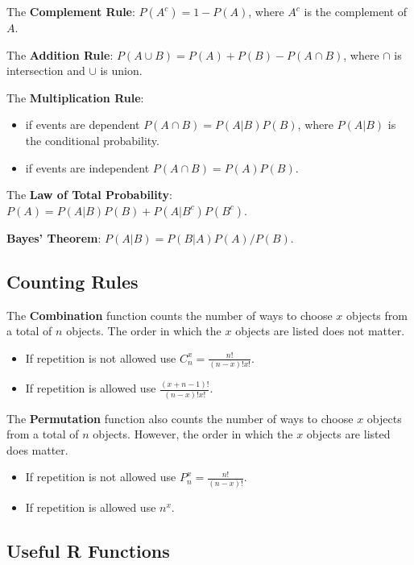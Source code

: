\documentclass[
  letterpaper,
  DIV=11,
  numbers=noendperiod]{scrreprt}
\begin{document}
The \textbf{Complement Rule}: \(P(A^c)=1-P(A)\), where \(A^c\) is the
complement of \(A\).

The \textbf{Addition Rule}: \(P(A \cup B)=P(A)+P(B)-P(A \cap B)\), where
\(\cap\) is intersection and \(\cup\) is union.

The \textbf{Multiplication Rule}:

\begin{itemize}
\item
  if events are dependent \(P(A \cap B)= P(A|B)P(B)\), where \(P(A|B)\)
  is the conditional probability.
\item
  if events are independent \(P(A \cap B)= P(A)P(B)\).
\end{itemize}

The \textbf{Law of Total Probability}:
\(P(A)=P(A|B)P(B)+P(A|B^c)P(B^c)\).

\textbf{Bayes' Theorem}: \(P(A|B)=P(B|A)P(A)/P(B)\).

\hypertarget{counting-rules}{%
\subsection*{Counting Rules}\label{counting-rules}}

The \textbf{Combination} function counts the number of ways to choose
\(x\) objects from a total of \(n\) objects. The order in which the
\(x\) objects are listed does not matter.

\begin{itemize}
\item
  If repetition is not allowed use \(C_n^x= \frac{n!}{(n-x)!x!}\).
\item
  If repetition is allowed use \(\frac{(x+n-1)!}{(n-x)!x!}\).
\end{itemize}

The \textbf{Permutation} function also counts the number of ways to
choose \(x\) objects from a total of \(n\) objects. However, the order
in which the \(x\) objects are listed does matter.

\begin{itemize}
\item
  If repetition is not allowed use \(P_n^x= \frac{n!}{(n-x)!}\).
\item
  If repetition is allowed use \(n^x\).
\end{itemize}

\hypertarget{useful-r-functions-7}{%
\subsection*{Useful R Functions}\label{useful-r-functions-7}}
\end{document}
